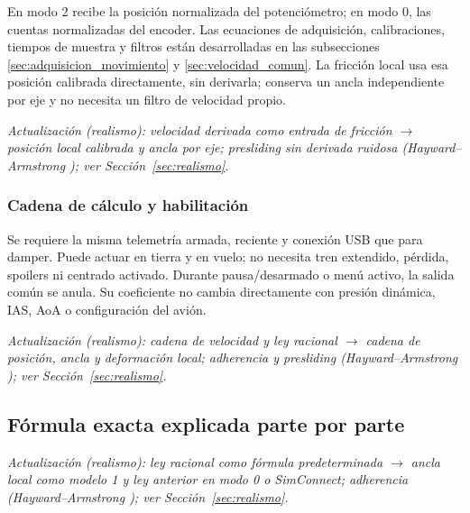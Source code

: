 En modo 2 recibe la posición normalizada del potenciómetro; en modo 0, las cuentas normalizadas del encoder. Las ecuaciones de adquisición, calibraciones, tiempos de muestra y filtros están desarrolladas en las subsecciones \ref{sec:adquisicion_movimiento} y \ref{sec:velocidad_comun}. La fricción local usa esa posición calibrada directamente, sin derivarla; conserva un ancla independiente por eje y no necesita un filtro de velocidad propio.

\textit{Actualización (realismo): velocidad derivada como entrada de fricción $\rightarrow$ posición local calibrada y ancla por eje; presliding sin derivada ruidosa (Hayward--Armstrong \cite{hayward2000}); ver Sección~\ref{sec:realismo}.}

\subsubsection{Cadena de cálculo y habilitación}
\begin{center}
\end{center}
Se requiere la misma telemetría armada, reciente y conexión USB que para damper. Puede actuar en tierra y en vuelo; no necesita tren extendido, pérdida, spoilers ni centrado activado. Durante pausa/desarmado o menú activo, la salida común se anula. Su coeficiente no cambia directamente con presión dinámica, IAS, AoA o configuración del avión.

\textit{Actualización (realismo): cadena de velocidad y ley racional $\rightarrow$ cadena de posición, ancla y deformación local; adherencia y presliding (Hayward--Armstrong \cite{hayward2000}); ver Sección~\ref{sec:realismo}.}

\subsection{Fórmula exacta explicada parte por parte}

\textit{Actualización (realismo): ley racional como fórmula predeterminada $\rightarrow$ ancla local como modelo 1 y ley anterior en modo 0 o SimConnect; adherencia (Hayward--Armstrong \cite{hayward2000}); ver Sección~\ref{sec:realismo}.}

